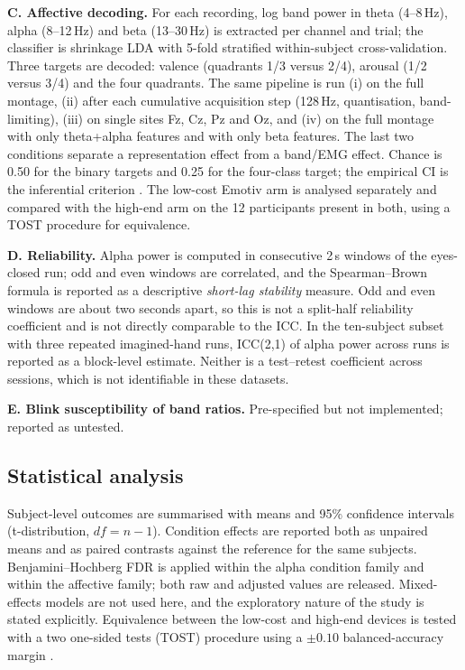 \textbf{C. Affective decoding.} For each recording, log band power in theta (4--8\,Hz),
alpha (8--12\,Hz) and beta (13--30\,Hz) is extracted per channel and trial; the
classifier is shrinkage LDA with 5-fold stratified within-subject cross-validation.
Three targets are decoded: valence (quadrants 1/3 versus 2/4), arousal (1/2 versus
3/4) and the four quadrants. The same pipeline is run (i) on the full montage,
(ii) after each cumulative acquisition step (128\,Hz, quantisation, band-limiting),
(iii) on single sites Fz, Cz, Pz and Oz, and (iv) on the full montage with only
theta+alpha features and with only beta features. The last two conditions separate a
representation effect from a band/EMG effect. Chance is 0.50 for the binary targets and
0.25 for the four-class target; the empirical CI is the inferential criterion
\citep{combrisson2015chance}. The low-cost Emotiv arm is analysed separately and compared
with the high-end arm on the 12 participants present in both, using a TOST procedure
for equivalence.

\textbf{D. Reliability.} Alpha power is computed in consecutive 2\,s windows of the
eyes-closed run; odd and even windows are correlated, and the Spearman--Brown formula is
reported as a descriptive \emph{short-lag stability} measure. Odd and even windows are
about two seconds apart, so this is not a split-half reliability coefficient and is not
directly comparable to the ICC. In the ten-subject subset with three repeated
imagined-hand runs, ICC(2,1) \citep{shrout1979icc} of alpha power across runs is reported
as a block-level estimate. Neither is a test--retest coefficient across sessions, which
is not identifiable in these datasets.

\textbf{E. Blink susceptibility of band ratios.} Pre-specified but not implemented;
reported as untested.

\subsection*{Statistical analysis}
Subject-level outcomes are summarised with means and 95\% confidence intervals
(t-distribution, $df=n-1$). Condition effects are reported both as unpaired means and
as paired contrasts against the reference for the same subjects. Benjamini--Hochberg
FDR \citep{benjamini1995fdr} is applied within the alpha condition family and within the
affective family; both raw and adjusted values are released. Mixed-effects models are
not used here, and the exploratory nature of the study is stated explicitly. Equivalence
between the low-cost and high-end devices is tested with a two one-sided tests (TOST)
procedure using a $\pm 0.10$ balanced-accuracy margin
\citep{lakens2018equivalence}.

